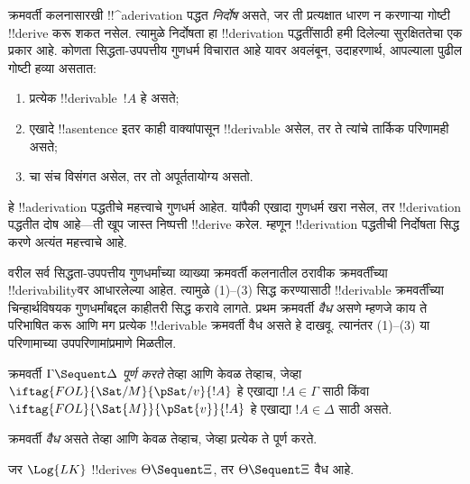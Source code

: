 \documentclass[../../../include/open-logic-section]{subfiles}
\begin{document}
      {}
      {}


\begin{explain}
क्रमवर्ती कलनासारखी !!^a{derivation} पद्धत \emph{निर्दोष} असते, जर ती
प्रत्यक्षात धारण न करणाऱ्या गोष्टी !!{derive} करू शकत नसेल. त्यामुळे
निर्दोषता हा !!{derivation} पद्धतींसाठी हमी दिलेल्या सुरक्षिततेचा एक प्रकार
आहे. कोणता सिद्धता-उपपत्तीय गुणधर्म विचारात आहे यावर अवलंबून, उदाहरणार्थ,
आपल्याला पुढील गोष्टी हव्या असतात:
\begin{enumerate}
\item प्रत्येक !!{derivable}~$!A$ हे  असते;
\item एखादे !!a{sentence} इतर काही वाक्यांपासून !!{derivable} असेल, तर ते
  त्यांचे तार्किक परिणामही असते;
\item {}चा संच विसंगत असेल, तर तो अपूर्ततायोग्य असतो.
\end{enumerate}
हे !!a{derivation} पद्धतीचे महत्त्वाचे गुणधर्म आहेत. यांपैकी एखादा गुणधर्म
खरा नसेल, तर !!{derivation} पद्धतीत दोष आहे—ती खूप जास्त निष्पत्ती
!!{derive} करेल. म्हणून !!{derivation} पद्धतीची निर्दोषता सिद्ध करणे अत्यंत
महत्त्वाचे आहे.

वरील सर्व सिद्धता-उपपत्तीय गुणधर्मांच्या व्याख्या क्रमवर्ती कलनातील ठरावीक
क्रमवर्तींच्या !!{derivability}वर आधारलेल्या आहेत. त्यामुळे (1)--(3) सिद्ध करण्यासाठी
!!{derivable} क्रमवर्तींच्या चिन्हार्थविषयक गुणधर्मांबद्दल काहीतरी सिद्ध करावे
लागते. प्रथम क्रमवर्ती \emph{वैध} असणे म्हणजे काय ते परिभाषित करू आणि मग
प्रत्येक !!{derivable} क्रमवर्ती वैध असते हे दाखवू. त्यानंतर (1)--(3) या
परिणामाच्या उपपरिणामांप्रमाणे मिळतील.
\end{explain}

\begin{defn}
 क्रमवर्ती
$\Gamma \Sequent \Delta$ \emph{पूर्ण करते} तेव्हा आणि केवळ तेव्हाच, जेव्हा
$\iftag{FOL}{\Sat/{M}}{\pSat/{v}}{!A}$ हे एखाद्या $!A \in \Gamma$ साठी किंवा
$\iftag{FOL}{\Sat{M}}{\pSat{v}}{!A}$ हे एखाद्या $!A \in \Delta$ साठी असते.

क्रमवर्ती \emph{वैध} असते तेव्हा आणि केवळ तेव्हाच, जेव्हा प्रत्येक
 ते पूर्ण करते.
\end{defn}

\begin{thm}[निर्दोषता]
 जर $\Log{LK}$ !!{derive}s $\Theta
\Sequent \Xi$, तर $\Theta \Sequent \Xi$ वैध आहे.
\end{thm}
\end{document}
